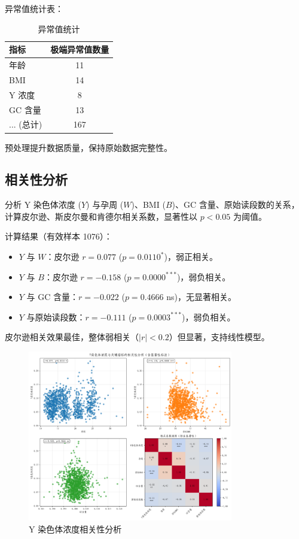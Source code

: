 \documentclass[withoutpreface,bwprint]{cumcmthesis} %
\begin{document}
异常值统计表：

\begin{table}[h]
    \centering
    \begin{tabular}{lc}
        \toprule
        指标 & 极端异常值数量 \\
        \midrule
        年龄 & 11 \\
        BMI & 14 \\
        Y 浓度 & 8 \\
        GC 含量 & 13 \\
        ... (总计) & 167 \\
        \bottomrule
    \end{tabular}
    \caption{异常值统计}
    \label{tab:outliers}
\end{table}

预处理提升数据质量，保持原始数据完整性。

\subsection{相关性分析}

分析 Y 染色体浓度 ($Y$) 与孕周 ($W$)、BMI ($B$)、GC 含量、原始读段数的关系，计算皮尔逊、斯皮尔曼和肯德尔相关系数，显著性以 $p < 0.05$ 为阈值。

计算结果（有效样本 1076）：
\begin{itemize}
    \item $Y$ 与 $W$：皮尔逊 $r=0.077$ ($p=0.0110^*$)，弱正相关。
    \item $Y$ 与 $B$：皮尔逊 $r=-0.158$ ($p=0.0000^{***}$)，弱负相关。
    \item $Y$ 与 GC 含量：$r=-0.022$ ($p=0.4666$ ns)，无显著相关。
    \item $Y$ 与原始读段数：$r=-0.111$ ($p=0.0003^{***}$)，弱负相关。
\end{itemize}

皮尔逊相关效果最佳，整体弱相关（$|r|<0.2$）但显著，支持线性模型。

\begin{figure}[h]
    \centering
    \includegraphics[width=0.8\textwidth]{../code/fig-1-1-y_chromosome_correlation_with_sig.png}
    \caption{Y 染色体浓度相关性分析}
    \label{fig:corr}
\end{figure}
\end{document}

